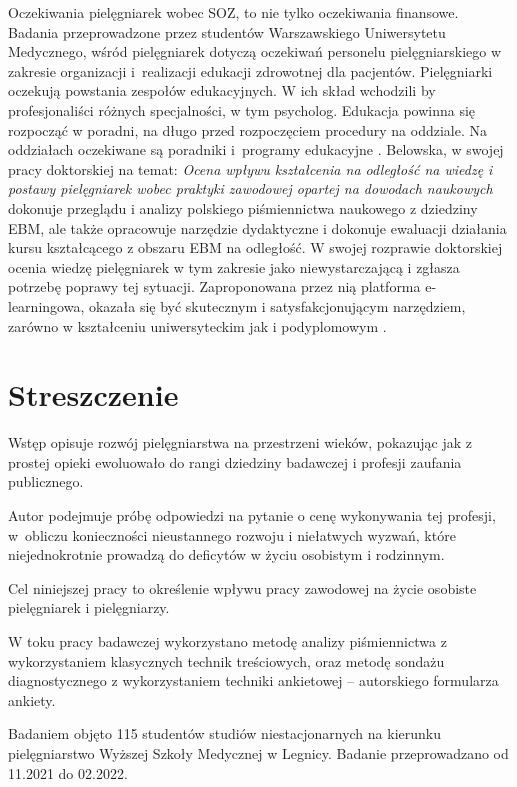 \documentclass[a4paper,12pt,twoside,openright]{mwrep}
\begin{document}
Oczekiwania pielęgniarek wobec SOZ, to nie tylko oczekiwania finansowe. Badania przeprowadzone przez studentów Warszawskiego Uniwersytetu Medycznego, wśród pielęgniarek dotyczą oczekiwań personelu pielęgniarskiego w zakresie organizacji i~realizacji edukacji zdrowotnej dla pacjentów.  Pielęgniarki oczekują powstania zespołów edukacyjnych. W ich skład wchodzili by profesjonaliści różnych specjalności, w tym psycholog. Edukacja powinna się rozpocząć w poradni, na długo przed rozpoczęciem procedury na oddziale. Na oddziałach oczekiwane są poradniki i~programy edukacyjne \cite{soz}.
Belowska, w swojej pracy doktorskiej na temat: \textit{Ocena wpływu kształcenia na odległość na wiedzę i postawy pielęgniarek wobec praktyki zawodowej opartej na dowodach naukowych} dokonuje przeglądu i analizy polskiego piśmiennictwa naukowego z dziedziny EBM, ale także opracowuje narzędzie dydaktyczne i dokonuje ewaluacji działania kursu kształcącego z obszaru EBM na odległość. W swojej rozprawie doktorskiej ocenia wiedzę pielęgniarek w tym zakresie jako niewystarczającą i zgłasza potrzebę poprawy tej sytuacji. Zaproponowana przez nią platforma e-learningowa, okazała się być skutecznym i satysfakcjonującym narzędziem, zarówno w kształceniu uniwersyteckim jak i podyplomowym \cite{belowska}.



\chapter*{Streszczenie}


Wstęp opisuje rozwój pielęgniarstwa na przestrzeni wieków, pokazując jak z prostej opieki ewoluowało do rangi dziedziny badawczej i profesji zaufania publicznego. 

Autor podejmuje próbę odpowiedzi na pytanie o cenę wykonywania tej profesji, w~obliczu konieczności nieustannego rozwoju i niełatwych wyzwań, które niejednokrotnie prowadzą do deficytów w życiu osobistym i rodzinnym. 

Cel niniejszej pracy to określenie wpływu pracy zawodowej na życie osobiste pielęgniarek i pielęgniarzy.

W toku pracy badawczej wykorzystano metodę analizy piśmiennictwa z wykorzystaniem klasycznych technik treściowych, oraz metodę sondażu diagnostycznego z wykorzystaniem techniki ankietowej – autorskiego formularza ankiety. 

Badaniem objęto 115 studentów studiów niestacjonarnych na kierunku pielęgniarstwo Wyższej Szkoły Medycznej w Legnicy. Badanie przeprowadzano od 11.2021 do 02.2022.
\end{document}
